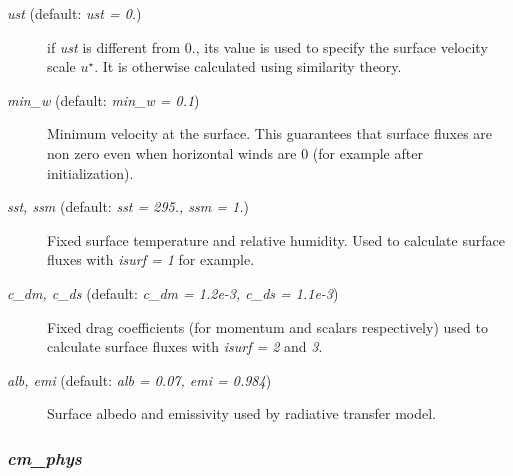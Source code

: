 \documentclass[12pt,A4,french]{article}
\begin{document}
\begin{description}
\item[{\it ust} (default: {\it ust = 0.})]

if {\it ust} is different from 0., its value is used to specify the surface velocity scale $u^{\star}$. It is otherwise calculated using similarity theory.

\item[{\it min\_w} (default: {\it min\_w = 0.1})]

Minimum velocity at the surface. This guarantees that surface fluxes are non zero even when horizontal winds are 0 (for example after initialization).

\item[{\it sst, ssm} (default: {\it sst = 295., ssm = 1.})]

Fixed surface temperature and relative humidity. Used to calculate surface fluxes with {\it isurf = 1} for example.

\item[{\it c\_dm, c\_ds} (default: {\it c\_dm = 1.2e-3, c\_ds = 1.1e-3})]

Fixed drag coefficients (for momentum and scalars respectively) used to calculate surface fluxes with {\it isurf = 2} and {\it 3}.

\item[{\it alb, emi} (default: {\it alb = 0.07, emi = 0.984})]

Surface albedo and emissivity used by radiative transfer model.

\end{description}

\subsubsection{{\it cm\_phys}}
\end{document}
